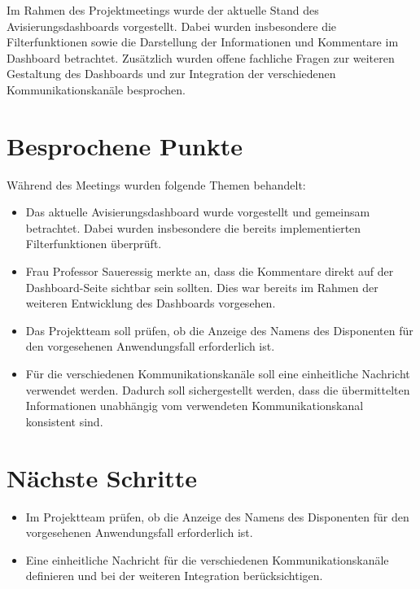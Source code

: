 \documentclass[a4paper,11pt]{article}
\begin{document}
Im Rahmen des Projektmeetings wurde der aktuelle Stand des Avisierungsdashboards vorgestellt. Dabei wurden insbesondere die Filterfunktionen sowie die Darstellung der Informationen und Kommentare im Dashboard betrachtet. Zusätzlich wurden offene fachliche Fragen zur weiteren Gestaltung des Dashboards und zur Integration der verschiedenen Kommunikationskanäle besprochen.

\vspace{0.5cm}

\section{Besprochene Punkte}

Während des Meetings wurden folgende Themen behandelt:

\begin{itemize}[leftmargin=1.2cm]

\item Das aktuelle Avisierungsdashboard wurde vorgestellt und gemeinsam betrachtet. Dabei wurden insbesondere die bereits implementierten Filterfunktionen überprüft.

\item Frau Professor Saueressig merkte an, dass die Kommentare direkt auf der Dashboard-Seite sichtbar sein sollten. Dies war bereits im Rahmen der weiteren Entwicklung des Dashboards vorgesehen.

\item Das Projektteam soll prüfen, ob die Anzeige des Namens des Disponenten für den vorgesehenen Anwendungsfall erforderlich ist.

\item Für die verschiedenen Kommunikationskanäle soll eine einheitliche Nachricht verwendet werden. Dadurch soll sichergestellt werden, dass die übermittelten Informationen unabhängig vom verwendeten Kommunikationskanal konsistent sind.

\end{itemize}

\vspace{0.5cm}

\section{Nächste Schritte}

\begin{itemize}[leftmargin=1.2cm]

\item Im Projektteam prüfen, ob die Anzeige des Namens des Disponenten für den vorgesehenen Anwendungsfall erforderlich ist.

\item Eine einheitliche Nachricht für die verschiedenen Kommunikationskanäle definieren und bei der weiteren Integration berücksichtigen.

\end{itemize}
\end{document}
